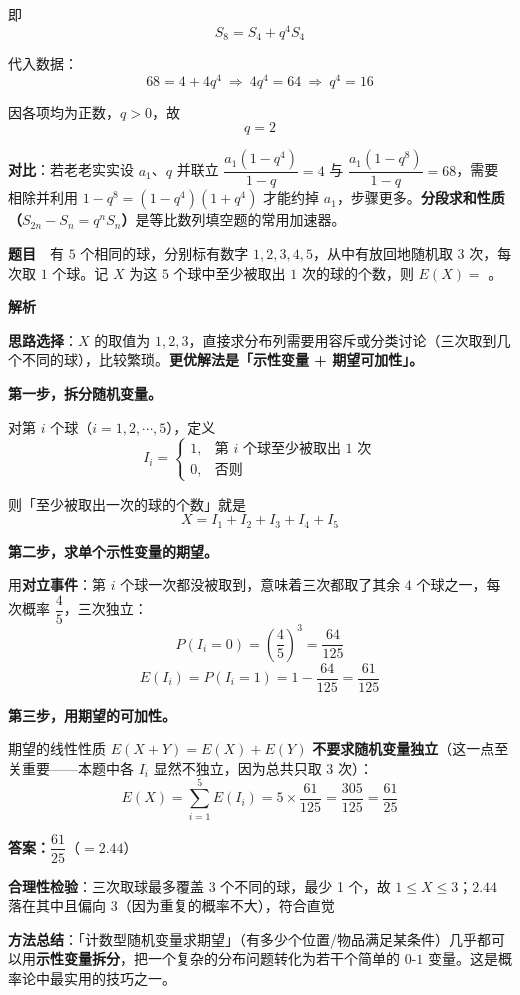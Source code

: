 即
\[S_8=S_4+q^4S_4\]

代入数据：
\[68=4+4q^4\ \Longrightarrow\ 4q^4=64\ \Longrightarrow\ q^4=16\]

因各项均为正数，$q>0$，故
\[q=2\]


\begin{gktip}
\textbf{对比}：若老老实实设 $a_1$、$q$ 并联立 $\dfrac{a_1(1-q^4)}{1-q}=4$ 与 $\dfrac{a_1(1-q^8)}{1-q}=68$，需要相除并利用 $1-q^8=(1-q^4)(1+q^4)$ 才能约掉 $a_1$，步骤更多。\textbf{分段求和性质（$S_{2n}-S_n=q^nS_n$）}是等比数列填空题的常用加速器。
\end{gktip}

\par\medskip


\textbf{题目}　有 $5$ 个相同的球，分别标有数字 $1,2,3,4,5$，从中有放回地随机取 $3$ 次，每次取 $1$ 个球。记 $X$ 为这 $5$ 个球中至少被取出 $1$ 次的球的个数，则 $E(X)=$ \gkblank{}。

\textbf{解析}

\textbf{思路选择}：$X$ 的取值为 $1,2,3$，直接求分布列需要用容斥或分类讨论（三次取到几个不同的球），比较繁琐。\textbf{更优解法是「示性变量 + 期望可加性」。}

\textbf{第一步，拆分随机变量。}

对第 $i$ 个球（$i=1,2,\cdots,5$），定义
\[I_i=\begin{cases}1,&\text{第 }i\text{ 个球至少被取出 }1\text{ 次}\\ 0,&\text{否则}\end{cases}\]

则「至少被取出一次的球的个数」就是
\[X=I_1+I_2+I_3+I_4+I_5\]

\textbf{第二步，求单个示性变量的期望。}

用\textbf{对立事件}：第 $i$ 个球一次都没被取到，意味着三次都取了其余 $4$ 个球之一，每次概率 $\dfrac45$，三次独立：
\[P(I_i=0)=\left(\frac45\right)^3=\frac{64}{125}\]
\[E(I_i)=P(I_i=1)=1-\frac{64}{125}=\frac{61}{125}\]

\textbf{第三步，用期望的可加性。}

期望的线性性质 $E(X+Y)=E(X)+E(Y)$ \textbf{不要求随机变量独立}（这一点至关重要——本题中各 $I_i$ 显然不独立，因为总共只取 3 次）：
\[E(X)=\sum_{i=1}^{5}E(I_i)=5\times\frac{61}{125}=\frac{305}{125}=\frac{61}{25}\]

\textbf{答案：$\dfrac{61}{25}$}（$=2.44$）

\begin{gktip}
\textbf{合理性检验}：三次取球最多覆盖 3 个不同的球，最少 1 个，故 $1\le X\le3$；$2.44$ 落在其中且偏向 $3$（因为重复的概率不大），符合直觉 

\textbf{方法总结}：「计数型随机变量求期望」（有多少个位置/物品满足某条件）几乎都可以用\textbf{示性变量拆分}，把一个复杂的分布问题转化为若干个简单的 $0$-$1$ 变量。这是概率论中最实用的技巧之一。
\end{gktip}

